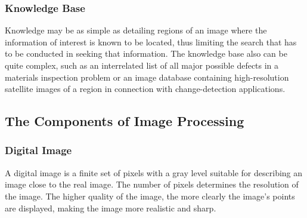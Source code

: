         \subsubsection{Knowledge Base}
            Knowledge may be as simple as detailing regions of an image where the information of interest is known to be located, thus limiting the search that has to be 
            conducted in seeking that information. The knowledge base also can be quite complex, such as an interrelated list of all major possible defects in a materials 
            inspection problem or an image database containing high-resolution satellite images of a region in connection with change-detection applications.
    \subsection{The Components of Image Processing}
        \subsubsection{Digital Image}
            A digital image is a finite set of pixels with a gray level suitable for describing an image close to the real image. The number of pixels 
            determines the resolution of the image. The higher quality of the image, the more clearly the image's points are displayed, making the image 
            more realistic and sharp.
